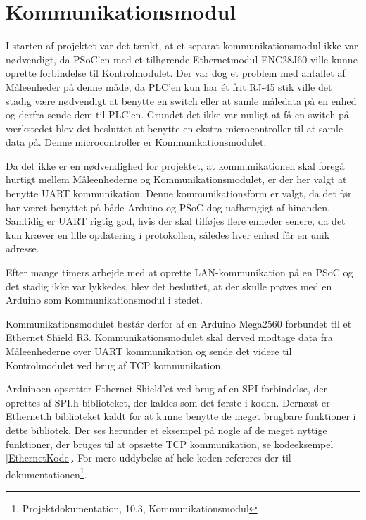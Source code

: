 
\section{Kommunikationsmodul}
\label{Kommunikationsmodul}

I starten af projektet var det tænkt, at et separat kommunikationsmodul ikke var nødvendigt, da PSoC'en med et tilhørende Ethernetmodul ENC28J60 ville kunne oprette forbindelse til Kontrolmodulet. Der var dog et problem med antallet af Måleenheder på denne måde, da PLC'en kun har ét frit RJ-45 stik ville det stadig være nødvendigt at benytte en switch eller at samle måledata på en enhed og derfra sende dem til PLC'en. Grundet det ikke var muligt at få en switch på værkstedet blev det besluttet at benytte en ekstra microcontroller til at samle data på. Denne microcontroller er Kommunikationsmodulet.   

Da det ikke er en nødvendighed for projektet, at kommunikationen skal foregå hurtigt mellem Måleenhederne og Kommunikationsmodulet, er der her valgt at benytte UART kommunikation. Denne kommunikationsform er valgt, da det før har været benyttet på både Arduino og PSoC dog uafhængigt af hinanden. Samtidig er UART rigtig god, hvis der skal tilføjes flere enheder senere, da det kun kræver en lille opdatering i protokollen, således hver enhed får en unik adresse.  

Efter mange timers arbejde med at oprette LAN-kommunikation på en PSoC og det stadig ikke var lykkedes, blev det besluttet, at der skulle prøves med en Arduino som Kommunikationsmodul i stedet. 

Kommunikationsmodulet består derfor af en Arduino Mega2560 forbundet til et Ethernet Shield R3. Kommunikationsmodulet skal derved modtage data fra Måleenhederne over UART kommunikation og sende det videre til Kontrolmodulet ved brug af TCP kommunikation. 

Arduinoen opsætter Ethernet Shield'et ved brug af en SPI forbindelse, der oprettes af SPI.h biblioteket, der kaldes som det første i koden. Dernæst er Ethernet.h biblioteket kaldt for at kunne benytte de meget brugbare funktioner i dette bibliotek\cite{Ethernet}. Der ses herunder et eksempel på nogle af de meget nyttige funktioner, der bruges til at opsætte TCP kommunikation, se kodeeksempel \ref{EthernetKode}. For mere uddybelse af hele koden refereres der til dokumentationen\footnote{Projektdokumentation, 10.3, Kommunikationsmodul}.

